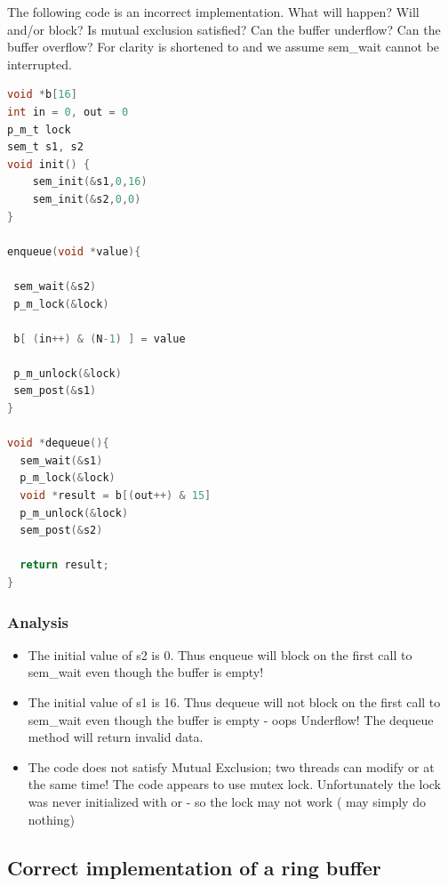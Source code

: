 The following code is an incorrect implementation. What will happen? Will  and/or  block? Is mutual exclusion satisfied? Can the buffer underflow? Can the buffer overflow? For clarity  is shortened to  and we assume sem\_wait cannot be interrupted.

\begin{lstlisting}[language=C]
void *b[16]
int in = 0, out = 0
p_m_t lock
sem_t s1, s2
void init() {
    sem_init(&s1,0,16)
    sem_init(&s2,0,0)
}

enqueue(void *value){

 sem_wait(&s2)
 p_m_lock(&lock)

 b[ (in++) & (N-1) ] = value

 p_m_unlock(&lock)
 sem_post(&s1)
}

void *dequeue(){
  sem_wait(&s1)
  p_m_lock(&lock)
  void *result = b[(out++) & 15]
  p_m_unlock(&lock)
  sem_post(&s2)

  return result;
}
\end{lstlisting}

\subsubsection{Analysis}\label{analysis-1}

\begin{itemize}
\tightlist
\item
  The initial value of s2 is 0. Thus enqueue will block on the first call to sem\_wait even though the buffer is empty!
\item
  The initial value of s1 is 16. Thus dequeue will not block on the first call to sem\_wait even though the buffer is empty - oops Underflow! The dequeue method will return invalid data.
\item
  The code does not satisfy Mutual Exclusion; two threads can modify  or  at the same time! The code appears to use mutex lock. Unfortunately the lock was never initialized with  or  - so the lock may not work ( may simply do nothing)
\end{itemize}

\subsection{Correct implementation of a ring buffer}\label{correct-implementation-of-a-ring-buffer}

